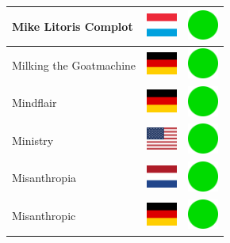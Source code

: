 \documentclass[12pt, a4paper, twoside]{report}
\begin{document}
\begin{center}
\begin{longtable}{|p{5cm}|p{2cm}|p{2cm}|}
Mike Litoris Complot & \includegraphics[width=1cm]{4x3/lu} & \includegraphics[width=1cm]{likes/y} \\ \hline
Milking the Goatmachine & \includegraphics[width=1cm]{4x3/de} & \includegraphics[width=1cm]{likes/y} \\ \hline
Mindflair & \includegraphics[width=1cm]{4x3/de} & \includegraphics[width=1cm]{likes/y} \\ \hline
Ministry & \includegraphics[width=1cm]{4x3/us} & \includegraphics[width=1cm]{likes/y} \\ \hline
Misanthropia & \includegraphics[width=1cm]{4x3/nl} & \includegraphics[width=1cm]{likes/y} \\ \hline
Misanthropic & \includegraphics[width=1cm]{4x3/de} & \includegraphics[width=1cm]{likes/y} \\ \hline

\end{longtable}
\end{center}
\end{document}
